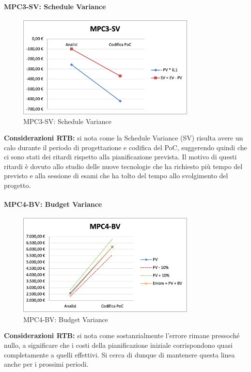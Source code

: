 \paragraph{MPC3-SV: Schedule Variance}
\begin{figure}[h!]
    \centering
    \includegraphics[width=0.8\textwidth]{images/MPC3-SV.png}
    \caption{MPC3-SV: Schedule Variance}
\end{figure}
\noindent \textbf{Considerazioni RTB:} si nota come la Schedule Variance (SV) risulta avere un calo durante il periodo di progettazione e codifica del PoC, suggerendo quindi che ci sono stati dei ritardi rispetto alla pianificazione prevista. Il motivo di questi ritardi è dovuto allo studio delle nuove tecnologie che ha richiesto più tempo del previsto e alla sessione di esami che ha tolto del tempo allo svolgimento del progetto.

\newpage
\paragraph{MPC4-BV: Budget Variance}
\begin{figure}[h!] 
    \centering
    \includegraphics[width=0.8\textwidth]{images/MPC4-BV.png}
    \caption{MPC4-BV: Budget Variance}
\end{figure}
\noindent \textbf{Considerazioni RTB:} si nota come sostanzialmente l'errore rimane pressoché nullo, a significare che i costi della pianificazione iniziale corrispondono quasi completamente a quelli effettivi. Si cerca di dunque di mantenere questa linea anche per i prossimi periodi.

